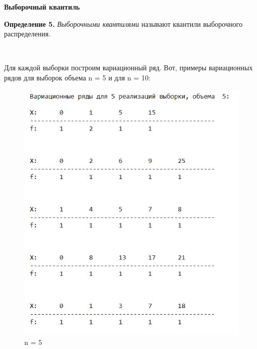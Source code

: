 \documentclass[a4paper,12pt, oneside]{book}
\begin{document}
\vspace{5mm}
\large{\textbf{Выборочный квантиль}}
\vspace{5mm}

\normalsize{\textbf{Определение 5.}} \textit{Выборочными квантилями } называют квантили выборочного распределения.

\vspace{5mm}
\\
\vspace{5mm}



Для каждой выборки построим вариационный ряд. Вот, примеры вариационных рядов для выборок объема n = 5 и для n = 10:

\begin{figure}[h!]
	\begin{center}
		\begin{minipage}[h]{0.4\linewidth}
			\includegraphics[width=1.5\linewidth]{var_ser_5.jpg}
			\caption{n = 5} %
		\end{minipage}
	

\end{center}
\end{figure}
\end{document}
